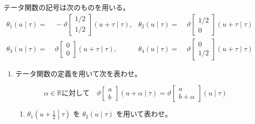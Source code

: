 \documentclass[12pt,b5paper]{ltjsarticle}
\begin{document}
\begin{enumerate}
       テータ関数の記号は次のものを用いる。
       \begin{align}
        \theta_{1}(u\mid\tau) =&\; -\vartheta \begin{bmatrix} 1/2 \\ 1/2 \end{bmatrix} (u+\tau \mid \tau)
        , &
        \theta_{2}(u\mid\tau) =&\; \vartheta \begin{bmatrix} 1/2 \\ 0 \end{bmatrix} (u+\tau \mid \tau)\\
        \theta_{3}(u\mid\tau) =&\; \vartheta \begin{bmatrix} 0 \\ 0 \end{bmatrix} (u+\tau \mid \tau)
        , &
        \theta_{4}(u\mid\tau) =&\; \vartheta \begin{bmatrix} 0 \\ 1/2 \end{bmatrix} (u+\tau \mid \tau)
       \end{align}


       \begin{enumerate}
        \item テータ関数の定義を用いて次を表わせ。

              \dotfill

              \begin{equation}
               \alpha\in\mathbb{R}に対して
                \quad
                \vartheta \begin{bmatrix} a \\ b \end{bmatrix} (u+\alpha \mid \tau)
                = \vartheta \begin{bmatrix} a \\ b+\alpha \end{bmatrix} (u \mid \tau)
              \end{equation}

              \dotfill
             \begin{enumerate}
              \item $\displaystyle \theta_{1} \left(u+\frac{1}{2} \middle| \tau \right)$
                    を
                    $\displaystyle \theta_{2} \left(u \mid \tau \right)$
                    を用いて表わせ。

                    \dotfill


\end{enumerate}
\end{enumerate}
\end{enumerate}
\end{document}
